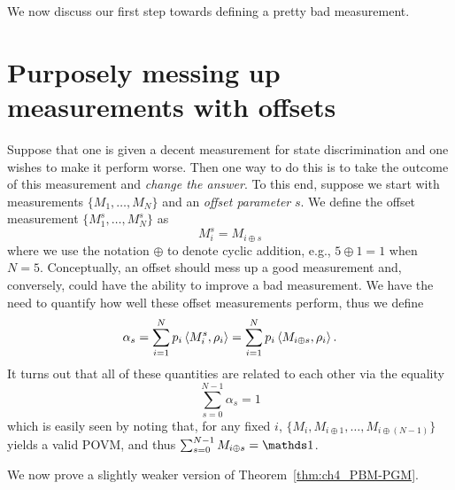 
We now discuss our first step towards defining a pretty bad measurement. 

\section{Purposely messing up measurements with offsets} \label{sec:ch4_PBM-offsets}

Suppose that one is given a decent measurement for state discrimination and one wishes to make it perform worse. 
Then one way to do this is to take the outcome of this measurement and \emph{change the answer}. 
To this end, suppose we start with measurements $\{M_1, \ldots, M_N\}$ and an \emph{offset parameter} $s$. 
We define the offset measurement $\{M^s_1, \ldots, M^s_N\}$ as 
\begin{equation} 
M^s_i = M_{i \oplus s} 
\end{equation} 
where we use the notation $\oplus$ to denote cyclic addition, e.g., $5 \oplus 1 = 1$ when $N = 5$. 
Conceptually, an offset should mess up a good measurement and, conversely, could have the ability to improve a bad measurement. 
We have the need to quantify how well these offset measurements perform, thus we define 
\begin{equation} 
\alpha_s = \sum_{i=1}^N p_i \left\langle M^s_i, \rho_i \right\rangle = \sum_{i=1}^N p_i \left\langle M_{i \oplus s}, \rho_i \right\rangle.  
\end{equation} 
It turns out that all of these quantities are related to each other via the equality 
\begin{equation}\label{eq:ch4_PBM-EqA3} 
\sum_{s=0}^{N-1} \alpha_s = 1 
\end{equation} 
which is easily seen by noting that, for any fixed $i$, $\{M_i, M_{i \oplus 1}, \ldots, M_{i \oplus (N-1)}\}$ yields a valid POVM, and thus $\sum_{s=0}^{N-1} M_{i \oplus s} = \id$.

We now prove a slightly weaker version of Theorem~\ref{thm:ch4_PBM-PGM}.


